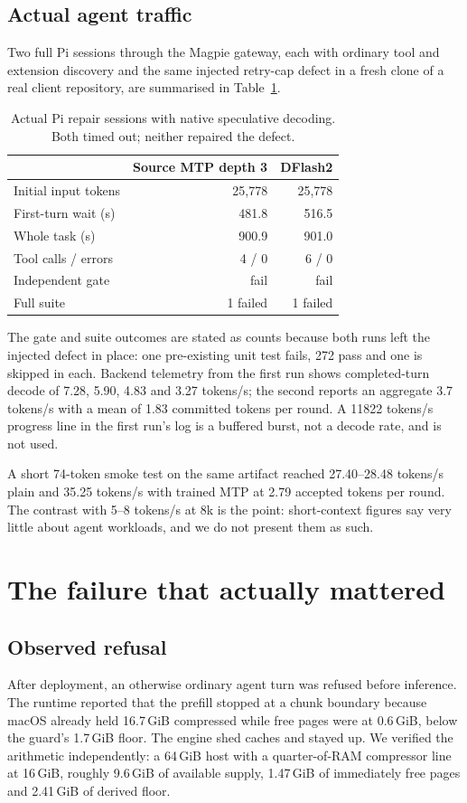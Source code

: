 \documentclass[11pt]{article}
\begin{document}
\subsection{Actual agent traffic}
Two full Pi sessions through the Magpie gateway, each with ordinary tool and extension discovery and the same injected retry-cap defect in a fresh clone of a real client repository, are summarised in Table~\ref{tab:repairs}.

\begin{table}[H]
\centering
\small
\caption{Actual Pi repair sessions with native speculative decoding. Both timed out; neither repaired the defect.}
\label{tab:repairs}
\begin{tabular}{@{}lrr@{}}
\toprule
 & Source MTP depth 3 & DFlash2\\
\midrule
Initial input tokens & 25{,}778 & 25{,}778\\
First-turn wait (s) & 481.8 & 516.5\\
Whole task (s) & 900.9 & 901.0\\
Tool calls / errors & 4 / 0 & 6 / 0\\
Independent gate & fail & fail\\
Full suite & 1 failed & 1 failed\\
\bottomrule
\end{tabular}
\end{table}

The gate and suite outcomes are stated as counts because both runs left the injected defect in place: one pre-existing unit test fails, 272 pass and one is skipped in each. Backend telemetry from the first run shows completed-turn decode of 7.28, 5.90, 4.83 and 3.27 tokens/s; the second reports an aggregate 3.7 tokens/s with a mean of 1.83 committed tokens per round. A 11822 tokens/s progress line in the first run's log is a buffered burst, not a decode rate, and is not used.

A short 74-token smoke test on the same artifact reached 27.40--28.48 tokens/s plain and 35.25 tokens/s with trained MTP at 2.79 accepted tokens per round. The contrast with 5--8 tokens/s at 8k is the point: short-context figures say very little about agent workloads, and we do not present them as such.

\section{The failure that actually mattered}
\subsection{Observed refusal}
After deployment, an otherwise ordinary agent turn was refused before inference. The runtime reported that the prefill stopped at a chunk boundary because macOS already held 16.7\,GiB compressed while free pages were at 0.6\,GiB, below the guard's 1.7\,GiB floor. The engine shed caches and stayed up. We verified the arithmetic independently: a 64\,GiB host with a quarter-of-RAM compressor line at 16\,GiB, roughly 9.6\,GiB of available supply, 1.47\,GiB of immediately free pages and 2.41\,GiB of derived floor.
\end{document}
